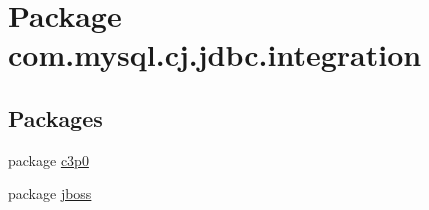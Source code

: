 \hypertarget{namespacecom_1_1mysql_1_1cj_1_1jdbc_1_1integration}{}\section{Package com.\+mysql.\+cj.\+jdbc.\+integration}
\label{namespacecom_1_1mysql_1_1cj_1_1jdbc_1_1integration}
\subsection*{Packages}
\begin{DoxyCompactItemize}
\item 
package \mbox{\hyperlink{namespacecom_1_1mysql_1_1cj_1_1jdbc_1_1integration_1_1c3p0}{c3p0}}
\item 
package \mbox{\hyperlink{namespacecom_1_1mysql_1_1cj_1_1jdbc_1_1integration_1_1jboss}{jboss}}
\end{DoxyCompactItemize}
